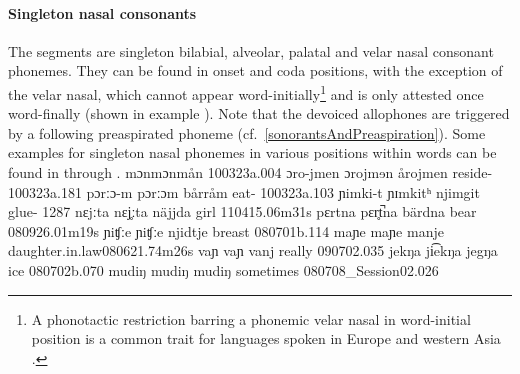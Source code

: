
\paragraph{Singleton nasal consonants}
The segments  are singleton bilabial, alveolar, palatal and velar nasal consonant phonemes. 
They can be found in onset and coda positions, with the exception of the velar nasal, which cannot appear word-initially\footnote{A phonotactic restriction barring a phonemic velar nasal in word-initial position is a common trait for languages spoken in Europe and western Asia \citep[cf.][]{Anderson2008a}.} 
and is only attested once word-finally (shown in example ). 
Note that the devoiced allophones are triggered by a following preaspirated phoneme (cf.~\SEC\ref{sonorantsAndPreaspiration}).
Some examples for singleton nasal phonemes in various positions within words can be found in  through .  
			{{m}ɔ{n}}{{m}ɔ{n}}{mån}	{}			{100323a}{.004}
		{ɔro-j{m}en}	{ɔroj{m}ɘn}	{årojmen}	{reside-}		{100323a}{.181}
				{pɔrːɔ-{m}}	{pɔrːɔ{m}}	{bårråm}	{eat-}			{100323a}{.103}
				{ɲi{m}ki-t}		{ɲɪ{m}kitʰ}	{njimgit}	{glue-}			{1287}
			{{n}ɛjːta}		{{n}ɛj̥ːta}		{näjjda}	{girl\BS{}}		{110415}{.06m31s}
			{pɛrt{n}a}		{pɛr̥t̚{n}a}		{bärdna}	{bear\BS{}}		{080926}{.01m19s}
		{{ɲ}iʧːe}		{{ɲ}iʧːe}		{njidtje}	{breast\BS{}}	{080701b}{.114}
	{ma{ɲ}e}		{ma{ɲ}e}		{manje}	{daughter.in.law\BS{}}{080621}{.74m26s}
				{va{ɲ}}		{va{ɲ}}		{vanj}	{really}					{090702}{.035}
			{jek{ŋ}a}		{ji͡ek{ŋ}a}		{jegŋa}	{ice\BS{}}		{080702b}{.070}
	{mudi{ŋ}}		{mudi{ŋ}}		{mudiŋ}	{sometimes}			{080708\_Session02}{.026}%

